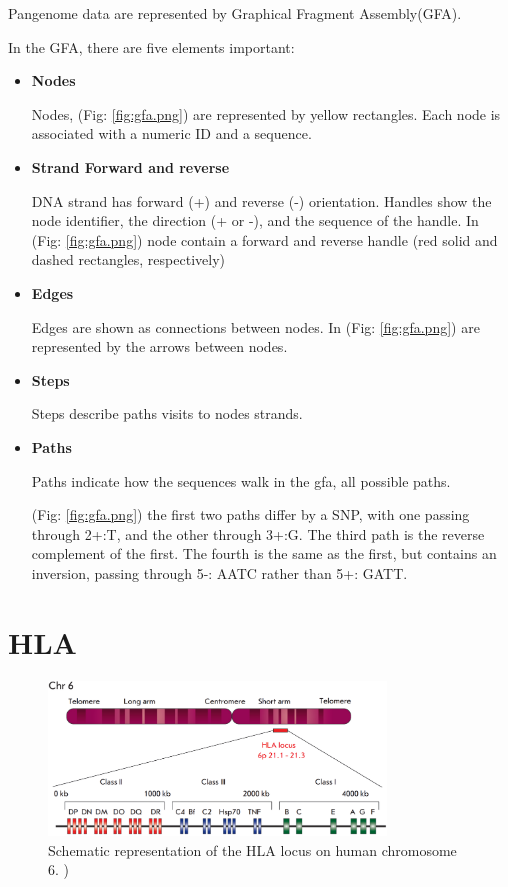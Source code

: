 Pangenome data are represented by Graphical Fragment Assembly(GFA).


In the GFA, there are five elements important:
\begin{itemize}

\item\textbf{Nodes}

Nodes, (Fig: \ref{fig:gfa.png}) are represented by yellow rectangles. Each node is associated with a numeric ID and a sequence.  

\item\textbf{Strand Forward and reverse}

DNA strand has forward (+) and reverse (-) orientation. Handles show the node identifier, the direction (+ or -), and the sequence of the handle.  In (Fig: \ref{fig:gfa.png}) node contain a forward and reverse handle (red solid and dashed rectangles, respectively)

\item\textbf{Edges}				

Edges are shown as connections between nodes. In (Fig: \ref{fig:gfa.png}) are represented by the arrows between nodes. 

\item\textbf{Steps}

Steps describe paths visits to nodes strands.

\item\textbf{Paths} 

Paths indicate how the sequences walk in the gfa, all possible paths.


(Fig: \ref{fig:gfa.png}) the first two paths differ by a SNP, with one passing through 2+:T, and the other through 3+:G. The third path is the reverse complement of the first. The fourth is the same as the first, but contains an inversion, passing through 5-: AATC rather than 5+: GATT.
\end{itemize}



\section{HLA}

\begin{figure}[H]
\centering
\includegraphics[width=0.80\textwidth]{fig/HLA_loci.png}
\decoRule
\caption{Schematic representation of the HLA locus on human chromosome 6. \cite{zakharova2019contribution})}
\label{fig:HLA.png}
\end{figure}


